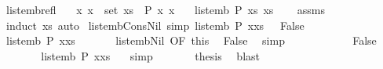 \begin{isabellebody}
\isanewline
{}\isamarkupfalse%
\ list{\isacharunderscore}emb{\isacharunderscore}refl{\isacharcolon}\isanewline
\ \ \ {\isachardoublequoteopen}{\isasymAnd}x{\isachardot}\ x\ {\isasymin}\ set\ xs\ {\isasymLongrightarrow}\ P\ x\ x{\isachardoublequoteclose}\isanewline
\ \ \ {\isachardoublequoteopen}list{\isacharunderscore}emb\ P\ xs\ xs{\isachardoublequoteclose}\isanewline
%
\isadelimproof
\ \ %
\endisadelimproof
%
\isatagproof
{}\isamarkupfalse%
\ assms\ \isamarkupfalse%
\ {\isacharparenleft}induct\ xs{\isacharparenright}\ auto%
\endisatagproof
{\isafoldproof}%
%
\isadelimproof
\isanewline
%
\endisadelimproof
\isanewline
{}\isamarkupfalse%
\ list{\isacharunderscore}emb{\isacharunderscore}Cons{\isacharunderscore}Nil\ {\isacharbrackleft}simp{\isacharbrackright}{\isacharcolon}\ {\isachardoublequoteopen}list{\isacharunderscore}emb\ P\ {\isacharparenleft}x{\isacharhash}xs{\isacharparenright}\ {\isacharbrackleft}{\isacharbrackright}\ {\isacharequal}\ False{\isachardoublequoteclose}\isanewline
%
\isadelimproof
%
\endisadelimproof
%
\isatagproof
{}\isamarkupfalse%
\ {\isacharminus}\isanewline
\ \ \isacommand{{\isacharbraceleft}}\isamarkupfalse%
\ \isamarkupfalse%
\ {\isachardoublequoteopen}list{\isacharunderscore}emb\ P\ {\isacharparenleft}x{\isacharhash}xs{\isacharparenright}\ {\isacharbrackleft}{\isacharbrackright}{\isachardoublequoteclose}\isanewline
\ \ \ \ \isamarkupfalse%
\ list{\isacharunderscore}emb{\isacharunderscore}Nil{}\ {\isacharbrackleft}OF\ this{\isacharbrackright}\ \isamarkupfalse%
\ False\ \isamarkupfalse%
\ simp\isanewline
\ \ \isacommand{{\isacharbraceright}}\isamarkupfalse%
\ \isamarkupfalse%
\ \isacommand{{\isacharbraceleft}}\isamarkupfalse%
\isanewline
\ \ \ \ \isamarkupfalse%
\ False\isanewline
\ \ \ \ \isamarkupfalse%
\ \isamarkupfalse%
\ {\isachardoublequoteopen}list{\isacharunderscore}emb\ P\ {\isacharparenleft}x{\isacharhash}xs{\isacharparenright}\ {\isacharbrackleft}{\isacharbrackright}{\isachardoublequoteclose}\ \isamarkupfalse%
\ simp\isanewline
\ \ \isacommand{{\isacharbraceright}}\isamarkupfalse%
\ \isamarkupfalse%
\ \isamarkupfalse%
\ {\isacharquery}thesis\ \isamarkupfalse%
\ blast\isanewline
{}\isamarkupfalse%
%
\endisatagproof
{\isafoldproof}%
%
\isadelimproof
\isanewline
%
\endisadelimproof

\end{isabellebody}
